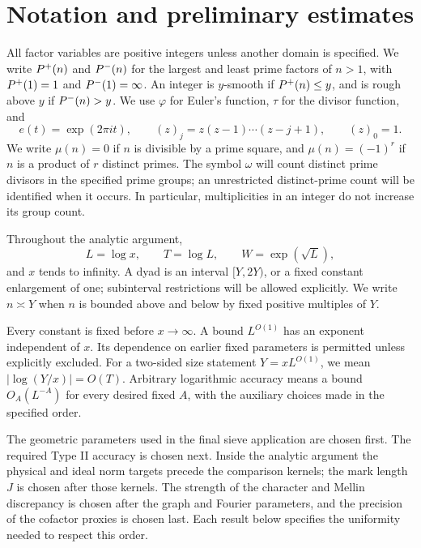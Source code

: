 \section{Notation and preliminary estimates}\label{sec:preliminaries}

All factor variables are positive integers unless another domain is specified.
We write $P^{+}(n)$ and $P^{-}(n)$ for the largest and least prime factors
of $n>1$, with $P^{+}(1)=1$ and $P^{-}(1)=\infty$.
An integer is $y$-smooth if $P^{+}(n)\le y$, and is rough above $y$ if
$P^{-}(n)>y$. We use $\varphi$ for Euler's function, $\tau$ for the divisor
function, and
\[
 e(t)=\exp(2\pi i t),\qquad
 (z)_j=z(z-1)\cdots(z-j+1),\qquad (z)_0=1.
\]
We write $\mu(n)=0$ if $n$ is divisible by a prime square, and
$\mu(n)=(-1)^r$ if $n$ is a product of $r$ distinct primes.
The symbol $\omega$ will count distinct prime divisors in the specified
prime groups; an unrestricted distinct-prime count will be identified when
it occurs. In particular, multiplicities in an integer do not increase
its group count.

Throughout the analytic argument,
\begin{equation}\label{eq:scales}
 L=\log x,\qquad T=\log L,\qquad W=\exp(\sqrt L),
\end{equation}
and $x$ tends to infinity. A dyad is an interval $[Y,2Y)$, or a fixed
constant enlargement of one; subinterval restrictions will be allowed
explicitly. We write $n\asymp Y$ when $n$ is bounded above and below by
fixed positive multiples of $Y$.

\begin{convention}\label{conv:parameters}
Every constant is fixed before $x\to\infty$. A bound $L^{O(1)}$ has an
exponent independent of $x$. Its dependence on earlier fixed parameters
is permitted unless explicitly excluded. For a two-sided size statement
$Y=xL^{O(1)}$, we mean $|\log(Y/x)|=O(T)$.
Arbitrary logarithmic accuracy means a bound $O_A(L^{-A})$ for every
desired fixed $A$, with the auxiliary choices made in the specified order.

The geometric parameters used in the final sieve application are chosen
first. The required Type II accuracy is chosen next. Inside the analytic
argument the physical and ideal norm targets precede the comparison
kernels; the mark length $J$ is chosen after those kernels. The strength
of the character and Mellin discrepancy is chosen after the graph and
Fourier parameters, and the precision of the cofactor proxies is chosen
last. Each result below specifies the uniformity needed to respect this
order.
\end{convention}

